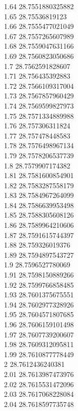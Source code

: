 {1.64	28.7551880325882\\
1.65	28.75536819123\\
1.66	28.7555477021049\\
1.67	28.7557265607989\\
1.68	28.7559047631166\\
1.69	28.7560823050686\\
1.7	28.7562591828607\\
1.71	28.756435392883\\
1.72	28.7566109317004\\
1.73	28.7567857960429\\
1.74	28.7569599827973\\
1.75	28.7571334889988\\
1.76	28.757306311824\\
1.77	28.757478448583\\
1.78	28.7576498967134\\
1.79	28.7578206537739\\
1.8	28.7579907174382\\
1.81	28.7581600854901\\
1.82	28.7583287558179\\
1.83	28.7584967264099\\
1.84	28.7586639953498\\
1.85	28.7588305608126\\
1.86	28.7589964210606\\
1.87	28.7591615744397\\
1.88	28.759326019376\\
1.89	28.7594897543727\\
1.9	28.7596527780069\\
1.91	28.7598150889266\\
1.92	28.7599766858485\\
1.93	28.7601375675551\\
1.94	28.7602977328926\\
1.95	28.7604571807685\\
1.96	28.7606159101498\\
1.97	28.7607739200607\\
1.98	28.7609312095811\\
1.99	28.7610877778449\\
2	28.7612436240381\\
2.01	28.7613987473976\\
2.02	28.7615531472096\\
2.03	28.7617068228084\\
2.04	28.7618597735748\\
}
